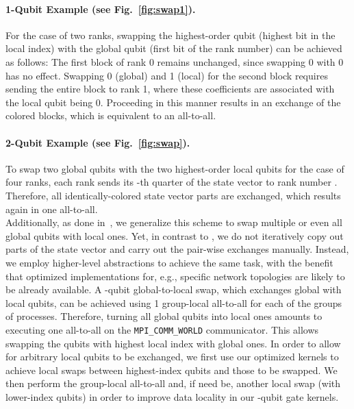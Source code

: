 \documentclass[sigconf]{acmart}
\begin{document}
\paragraph{1-Qubit Example (see Fig.~\ref{fig:swap1}).} For the case of two ranks, swapping the highest-order qubit (highest bit in the local index) with the global qubit (first bit of the rank number) can be achieved as follows: The first block of rank 0 remains unchanged, since swapping 0 with 0 has no effect. Swapping 0 (global) and 1 (local) for the second block requires sending the entire block to rank 1, where these coefficients are associated with the local qubit being 0. Proceeding in this manner results in an exchange of the colored blocks, which is equivalent to an all-to-all.
\paragraph{2-Qubit Example (see Fig.~\ref{fig:swap}).} To swap two global qubits with the two highest-order local qubits for the case of four ranks, each rank sends its -th quarter of the state vector to rank number . Therefore, all identically-colored state vector parts are exchanged, which results again in one all-to-all.\\


Additionally, as done in~\cite{de2007massively}, we generalize this scheme to swap multiple or even all global qubits with local ones. Yet, in contrast to \cite{de2007massively}, we do not iteratively copy out parts of the state vector and carry out the pair-wise exchanges manually. Instead, we employ higher-level abstractions to achieve the same task, with the benefit that optimized implementations for, e.g., specific network topologies are likely to be already available. A -qubit global-to-local swap, which exchanges  global with  local qubits, can be achieved using 1 group-local all-to-all for each of the  groups of processes. Therefore, turning all global qubits into local ones amounts to executing one all-to-all on the \texttt{MPI\_COMM\_WORLD} communicator. This allows swapping the  qubits with highest local index with  global ones. In order to allow for arbitrary local qubits to be exchanged, we first use our optimized kernels to achieve local swaps between highest-index qubits and those to be swapped. We then perform the group-local all-to-all and, if need be, another local swap (with lower-index qubits) in order to improve data locality in our -qubit gate kernels.
\end{document}
